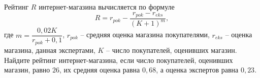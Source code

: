 \begin{ex}
	\begin{condition}
		Рейтинг \( R \) интернет-магазина вычисляется по формуле 
		\[ R=r_{pok}-\dfrac{r_{pok}-r_{eks}}{(K+1)^m}, \]
		где \( m=\dfrac{0,02K}{r_{pok}+0,1} \), \( r_{pok} \) -- средняя оценка магазина покупателями, \( r_{eks} \) -- оценка магазина, данная экспертами, \( K \) -- число покупателей, оценивших магазин. Найдите рейтинг интернет-магазина, если число покупателей, оценивших магазин, равно \( 26 \), их средняя оценка равна \(0,68\), а оценка экспертов равна \(0,23\).
	\end{condition}
\end{ex}